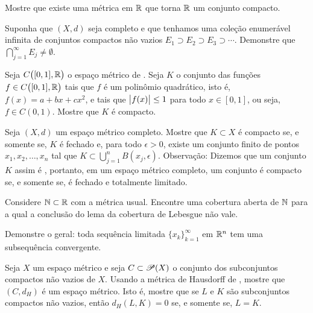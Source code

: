 \begin{exercise}[Desafio]
Mostre que existe uma métrica em ${\mathbb{R}}$ que torna ${\mathbb{R}}$ um conjunto compacto.
\end{exercise}

\begin{exercise}
Suponha que $(X,d)$ seja completo e que tenhamos uma coleção enumerável infinita
de conjuntos compactos não vazios $E_1 \supset E_2 \supset E_3 \supset
\cdots$. Demonstre que $\bigcap_{j=1}^\infty E_j \neq \emptyset$.
\end{exercise}


\begin{exercise}[Desafio]
Seja $C\bigl([0,1],{\mathbb{R}}\bigr)$ o espaço métrico de .
Seja $K$ o conjunto das funções $f \in C\bigl([0,1],{\mathbb{R}}\bigr)$ tais que
$f$ é um polinômio quadrático, isto é, $f(x) = a+bx+cx^2$, e tais que
$\bigl\lvert {f(x)} \bigr\rvert \leq 1$ para todo $x \in [0,1]$,
ou seja, $f \in C(0,1)$. Mostre que $K$ é compacto.
\end{exercise}

\begin{exercise}[Desafio] \label{exercise:mstotbound}
Seja $(X,d)$ um espaço métrico completo.
Mostre que $K \subset X$ é compacto se, e somente se, $K$ é fechado
e, para todo $\epsilon > 0$,
existe um conjunto finito de pontos $x_1,x_2,\ldots,x_n$ tal que
$K \subset \bigcup_{j=1}^n B(x_j,\epsilon)$.
Observação: Dizemos que um conjunto $K$ assim é \emph{},
portanto, em um espaço métrico completo, um conjunto é compacto se, e somente
se, é fechado e totalmente limitado.
\end{exercise}

\begin{exercise}
Considere ${\mathbb{N}} \subset {\mathbb{R}}$ com a métrica usual. Encontre uma cobertura aberta de ${\mathbb{N}}$
para a qual a conclusão do lema da cobertura de Lebesgue não vale.
\end{exercise}

\begin{exercise}
Demonstre o  geral:
toda sequência limitada $\{ x_k \}_{k=1}^\infty$ em ${\mathbb{R}}^n$
tem uma subsequência convergente.
\end{exercise}

\begin{exercise}
Seja $X$ um espaço métrico e seja
$C \subset {\mathscr{P}}(X)$ o conjunto dos subconjuntos compactos não vazios de $X$.
Usando a métrica de Hausdorff de ,
mostre que $(C,d_H)$ é um espaço métrico. Isto é, mostre que
se $L$ e $K$ são subconjuntos compactos não vazios, então $d_H(L,K) = 0$
se, e somente se, $L=K$.
\end{exercise}

